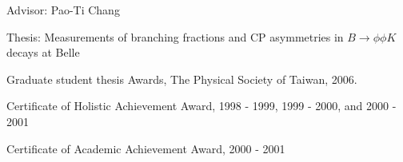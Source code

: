 \documentclass[letterpaper]{deedy-resume-openfont}
\begin{document}
\begin{tightemize}
\item Advisor: Pao-Ti Chang
\item Thesis: Measurements of branching fractions and CP asymmetries in $B \to \phi \phi K$ decays at Belle\\
      \href{http://www.airitilibrary.com/Publication/alDetailedMesh1?DocID=U0001-1407200616551200}{\color{link}{Thesis link}}
\item Graduate student thesis Awards, The Physical Society of Taiwan, 2006.
\end{tightemize}
\sectionsep

\begin{tightemize}
\item Certificate of Holistic Achievement Award, 1998 - 1999, 1999 - 2000, and 2000 - 2001
\item Certificate of Academic Achievement Award, 2000 - 2001
\end{tightemize}
\sectionsep


%
%


\end{document}
